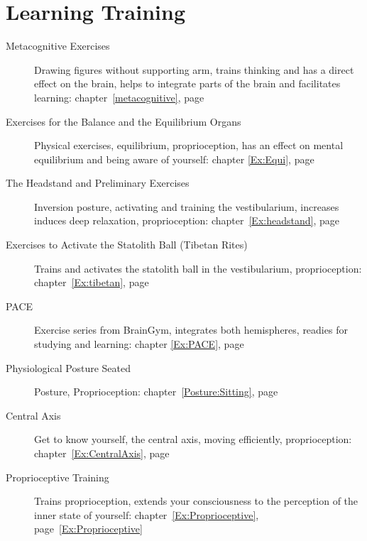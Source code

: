 \documentclass[../main.tex]{subfiles}
\begin{document}
\section{Learning Training}
\begin{description} 
\item[Metacognitive Exercises] Drawing figures without supporting arm, trains thinking and has a direct effect on the brain, helps to integrate parts of the brain and facilitates learning: chapter~\ref{metacognitive}, page~\pageref{metacognitive}
\item[Exercises for the Balance and the Equilibrium Organs] Physical exercises, equilibrium, proprioception, has an effect on mental equilibrium and being aware of yourself: chapter \ref{Ex:Equi}, page~\pageref{Ex:Equi}
\item[The Headstand and Preliminary Exercises] Inversion posture, activating and training the vestibularium, increases induces deep relaxation, proprioception: chapter~\ref{Ex:headstand}, page~\pageref{Ex:headstand}
\item[Exercises to Activate the Statolith Ball (Tibetan Rites)] Trains and activates the statolith ball in the vestibularium, proprioception:
  chapter~\ref{Ex:tibetan}, page~\pageref{Ex:tibetan}
\item[PACE] Exercise series from BrainGym, integrates both hemispheres, readies for studying and learning: chapter \ref{Ex:PACE}, page \pageref{Ex:PACE}
\item[Physiological Posture Seated] Posture, Proprioception: chapter~\ref{Posture:Sitting}, page~\pageref{Posture:Sitting}
\item[Central Axis] Get to know yourself, the central axis, moving efficiently, proprioception: chapter~\ref{Ex:CentralAxis}, page~\pageref{Ex:CentralAxis}
\item[Proprioceptive Training] Trains proprioception, extends your consciousness to the perception of the inner state of yourself: chapter~\ref{Ex:Proprioceptive}, page~\ref{Ex:Proprioceptive}
\end{description}
\end{document}
